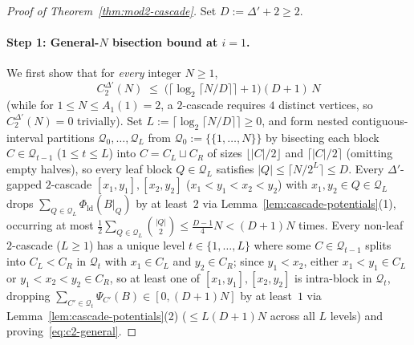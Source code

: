 \documentclass[11pt]{article}
\theoremstyle{definition}
\theoremstyle{remark}
\newcommand{\ld}{\mathrm{ld}}
\begin{document}
\begin{proof}[Proof of Theorem~\ref{thm:mod2-cascade}]
Set $D := \Delta' + 2 \ge 2$.

\paragraph{Step 1: General-$N$ bisection bound at $i = 1$.}
We first show that for \emph{every} integer $N \ge 1$,
\begin{equation}
\label{eq:c2-general}
C^{\Delta'}_2(N) \;\le\; \Big(\big\lceil \log_2 \lceil N / D \rceil \big\rceil + 1\Big)(D + 1)\,N
\end{equation}
(while for $1 \le N \le A_1(1) = 2$, a $2$-cascade requires $4$ distinct vertices, so $C^{\Delta'}_2(N) = 0$ trivially). Set $L := \lceil \log_2 \lceil N / D \rceil \rceil \ge 0$, and form nested contiguous-interval partitions $\mathcal{Q}_0, \dots, \mathcal{Q}_L$ from $\mathcal{Q}_0 := \{\{1, \dots, N\}\}$ by bisecting each block $C \in \mathcal{Q}_{t-1}$ ($1 \le t \le L$) into $C = C_L \sqcup C_R$ of sizes $\lfloor |C| / 2 \rfloor$ and $\lceil |C| / 2 \rceil$ (omitting empty halves), so every leaf block $Q \in \mathcal{Q}_L$ satisfies $|Q| \le \lceil N / 2^L \rceil \le D$. Every $\Delta'$-gapped $2$-cascade $[x_1, y_1], [x_2, y_2]$ ($x_1 < y_1 < x_2 < y_2$) with $x_1, y_2 \in Q \in \mathcal{Q}_L$ drops $\sum_{Q \in \mathcal{Q}_L} \Phi_{\ld}(B|_Q)$ by at least~$2$ via Lemma~\ref{lem:cascade-potentials}(1), occurring at most $\frac{1}{2}\sum_{Q \in \mathcal{Q}_L} \binom{|Q|}{2} \le \frac{D - 1}{4} N < (D + 1) N$ times. Every non-leaf $2$-cascade ($L \ge 1$) has a unique level $t \in \{1, \dots, L\}$ where some $C \in \mathcal{Q}_{t-1}$ splits into $C_L < C_R$ in $\mathcal{Q}_t$ with $x_1 \in C_L$ and $y_2 \in C_R$; since $y_1 < x_2$, either $x_1 < y_1 \in C_L$ or $y_1 < x_2 < y_2 \in C_R$, so at least one of $[x_1, y_1], [x_2, y_2]$ is intra-block in $\mathcal{Q}_t$, dropping $\sum_{C' \in \mathcal{Q}_t} \Psi_{C'}(B) \in [0, (D + 1) N]$ by at least~$1$ via Lemma~\ref{lem:cascade-potentials}(2) ($\le L(D + 1) N$ across all $L$ levels) and proving~\eqref{eq:c2-general}.


\end{proof}
\end{document}
